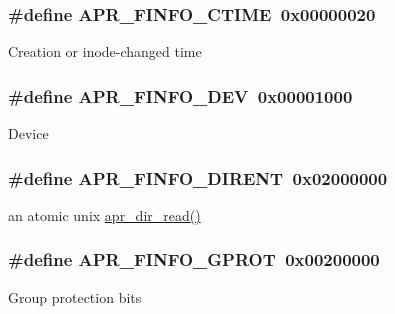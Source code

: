 \subsubsection[{\texorpdfstring{A\+P\+R\+\_\+\+F\+I\+N\+F\+O\+\_\+\+C\+T\+I\+ME}{APR_FINFO_CTIME}}]{\setlength{\rightskip}{0pt plus 5cm}\#define A\+P\+R\+\_\+\+F\+I\+N\+F\+O\+\_\+\+C\+T\+I\+ME~0x00000020}\hypertarget{group__apr__file__stat_ga98bef78baf71fa63b06352704f128bca}{}\label{group__apr__file__stat_ga98bef78baf71fa63b06352704f128bca}
Creation or inode-\/changed time 
\subsubsection[{\texorpdfstring{A\+P\+R\+\_\+\+F\+I\+N\+F\+O\+\_\+\+D\+EV}{APR_FINFO_DEV}}]{\setlength{\rightskip}{0pt plus 5cm}\#define A\+P\+R\+\_\+\+F\+I\+N\+F\+O\+\_\+\+D\+EV~0x00001000}\hypertarget{group__apr__file__stat_ga0890d31145211f62d38dd8e444b5660a}{}\label{group__apr__file__stat_ga0890d31145211f62d38dd8e444b5660a}
Device 
\subsubsection[{\texorpdfstring{A\+P\+R\+\_\+\+F\+I\+N\+F\+O\+\_\+\+D\+I\+R\+E\+NT}{APR_FINFO_DIRENT}}]{\setlength{\rightskip}{0pt plus 5cm}\#define A\+P\+R\+\_\+\+F\+I\+N\+F\+O\+\_\+\+D\+I\+R\+E\+NT~0x02000000}\hypertarget{group__apr__file__stat_gaac6679307cc735f2f0373960db96b931}{}\label{group__apr__file__stat_gaac6679307cc735f2f0373960db96b931}
an atomic unix \hyperlink{unix_2dir_8c_a3e4ee253e0c712160bee10bfb9c8e4a8}{apr\+\_\+dir\+\_\+read()} 
\subsubsection[{\texorpdfstring{A\+P\+R\+\_\+\+F\+I\+N\+F\+O\+\_\+\+G\+P\+R\+OT}{APR_FINFO_GPROT}}]{\setlength{\rightskip}{0pt plus 5cm}\#define A\+P\+R\+\_\+\+F\+I\+N\+F\+O\+\_\+\+G\+P\+R\+OT~0x00200000}\hypertarget{group__apr__file__stat_gadfa294303e34528b1fcae1bc009140c1}{}\label{group__apr__file__stat_gadfa294303e34528b1fcae1bc009140c1}
Group protection bits 
